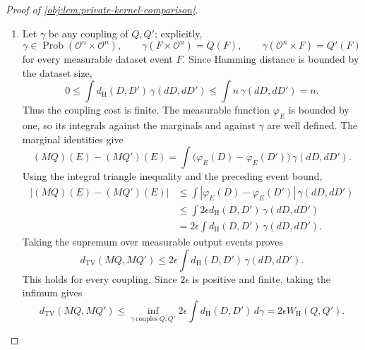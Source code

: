 \documentclass[11pt]{article}
\begin{document}
\begin{proof}[Proof of \cref{obj:lem:private-kernel-comparison}]
\begin{enumerate}
\item Let \(\gamma\) be any coupling of \(Q,Q'\); explicitly,
\[
\gamma\in\operatorname{Prob}(\mathcal O^n\times\mathcal O^n),
\qquad
\gamma(F\times\mathcal O^n)=Q(F),
\qquad
\gamma(\mathcal O^n\times F)=Q'(F)
\]
for every measurable dataset event \(F\). Since Hamming distance is bounded by the dataset size,
\[
0\le
\int d_{\mathrm H}(D,D')\,\gamma(dD,dD')
\le
\int n\,\gamma(dD,dD')
=n.
\]
Thus the coupling cost is finite. The measurable function \(\varphi_E\) is bounded by one, so its integrals against the marginals and against \(\gamma\) are well defined. The marginal identities give
\[
(MQ)(E)-(MQ')(E)
=
\int\bigl(\varphi_E(D)-\varphi_E(D')\bigr)\,
\gamma(dD,dD').
\]
Using the integral triangle inequality and the preceding event bound,
\[
\begin{aligned}
|(MQ)(E)-(MQ')(E)|
&\le
\int|\varphi_E(D)-\varphi_E(D')|\,\gamma(dD,dD')\\
&\le
\int2\epsilon d_{\mathrm H}(D,D')\,\gamma(dD,dD')\\
&=
2\epsilon\int d_{\mathrm H}(D,D')\,\gamma(dD,dD').
\end{aligned}
\]
Taking the supremum over measurable output events proves
\[
d_{\mathrm{TV}}(MQ,MQ')
\le
2\epsilon\int d_{\mathrm H}(D,D')\,\gamma(dD,dD').
\]
This holds for every coupling. Since \(2\epsilon\) is positive and finite, taking the infimum gives
\[
d_{\mathrm{TV}}(MQ,MQ')
\le
\inf_{\gamma\ \mathrm{couples}\ Q,Q'}
2\epsilon\int d_{\mathrm H}(D,D')\,d\gamma
=
2\epsilon W_{\mathrm H}(Q,Q').
\]


\end{enumerate}
\end{proof}
\end{document}
